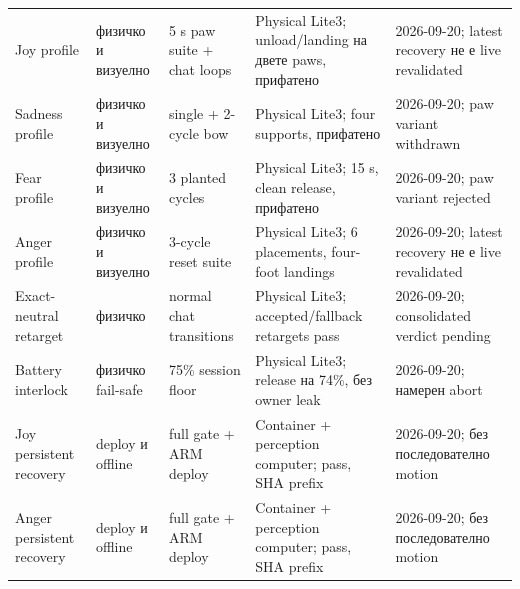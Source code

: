\begin{longtable}{@{}L{0.18\textwidth}L{0.11\textwidth}L{0.18\textwidth}L{0.29\textwidth}L{0.18\textwidth}@{}}
Joy profile & физичко и визуелно & 5 s paw suite + chat loops & Physical Lite3; unload/landing на двете paws, прифатено & 2026-09-20; latest recovery не е live revalidated \\
Sadness profile & физичко и визуелно & single + 2-cycle bow & Physical Lite3; four supports, прифатено & 2026-09-20; paw variant withdrawn \\
Fear profile & физичко и визуелно & 3 planted cycles & Physical Lite3; 15 s, clean release, прифатено & 2026-09-20; paw variant rejected \\
Anger profile & физичко и визуелно & 3-cycle reset suite & Physical Lite3; 6 placements, four-foot landings & 2026-09-20; latest recovery не е live revalidated \\
Exact-neutral retarget & физичко & normal chat transitions & Physical Lite3; accepted/fallback retargets pass & 2026-09-20; consolidated verdict pending \\
Battery interlock & физичко fail-safe & 75\% session floor & Physical Lite3; release на 74\%, без owner leak & 2026-09-20; намерен abort \\
Joy persistent recovery & deploy и offline & full gate + ARM deploy & Container + perception computer; pass, SHA prefix  & 2026-09-20; без последователно motion \\
Anger persistent recovery & deploy и offline & full gate + ARM deploy & Container + perception computer; pass, SHA prefix  & 2026-09-20; без последователно motion \\
\end{longtable}
\endgroup
